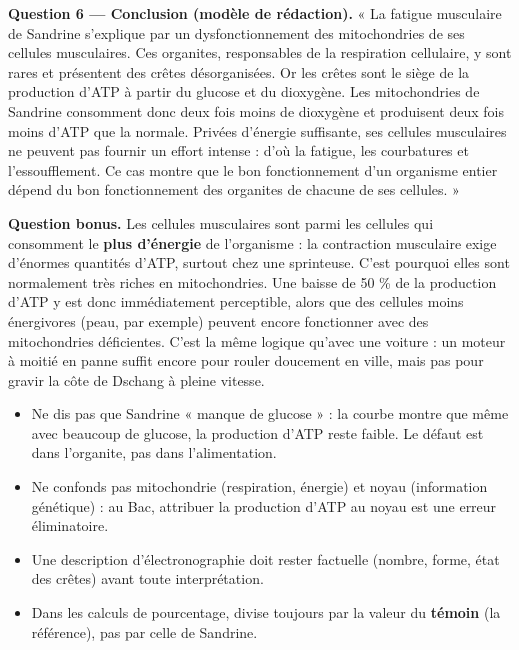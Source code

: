\documentclass[11pt]{article}
\newcommand{\cle}[1]{{\popxbold\color{popdark}#1}}
\begin{document}
\begin{exoresolu}
\textbf{Question 6 — Conclusion (modèle de rédaction).} « La fatigue musculaire de Sandrine s'explique par un dysfonctionnement des mitochondries de ses cellules musculaires. Ces organites, responsables de la respiration cellulaire, y sont rares et présentent des crêtes désorganisées. Or les crêtes sont le siège de la production d'ATP à partir du glucose et du dioxygène. Les mitochondries de Sandrine consomment donc deux fois moins de dioxygène et produisent deux fois moins d'ATP que la normale. Privées d'énergie suffisante, ses cellules musculaires ne peuvent pas fournir un effort intense : d'où la fatigue, les courbatures et l'essoufflement. Ce cas montre que le bon fonctionnement d'un organisme entier dépend du bon fonctionnement des organites de chacune de ses cellules. »

\textbf{Question bonus.} Les cellules musculaires sont parmi les cellules qui consomment le \textbf{plus d'énergie} de l'organisme : la contraction musculaire exige d'énormes quantités d'ATP, surtout chez une sprinteuse. C'est pourquoi elles sont normalement très riches en mitochondries. Une baisse de 50 \% de la production d'ATP y est donc immédiatement perceptible, alors que des cellules moins énergivores (peau, par exemple) peuvent encore fonctionner avec des mitochondries déficientes. C'est la même logique qu'avec une voiture : un moteur à moitié en panne suffit encore pour rouler doucement en ville, mais pas pour gravir la côte de Dschang à pleine vitesse.
\end{exoresolu}

\begin{attention}
\begin{itemize}
\item Ne dis pas que Sandrine « manque de glucose » : la courbe montre que même avec beaucoup de glucose, la production d'ATP reste faible. Le défaut est dans l'organite, pas dans l'alimentation.
\item Ne confonds pas \cle{mitochondrie} (respiration, énergie) et \cle{noyau} (information génétique) : au Bac, attribuer la production d'ATP au noyau est une erreur éliminatoire.
\item Une description d'électronographie doit rester factuelle (nombre, forme, état des crêtes) avant toute interprétation.
\item Dans les calculs de pourcentage, divise toujours par la valeur du \textbf{témoin} (la référence), pas par celle de Sandrine.
\end{itemize}
\end{attention}
\end{document}
